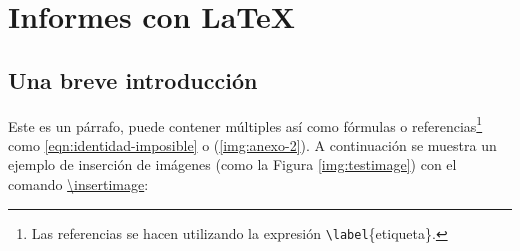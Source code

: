%
%

\section{Informes con \LaTeX}

\subsection{Una breve introducción}
	
	Este es un párrafo, puede contener múltiples  así como fórmulas o referencias\footnote{Las referencias se hacen utilizando la expresión \texttt{\textbackslash label}\{etiqueta\}.} como \eqref{eqn:identidad-imposible} o (\ref{img:anexo-2}). A continuación se muestra un ejemplo de inserción de imágenes (como la Figura \ref{img:testimage}) con el comando \href{https://template-latex.github.io/informe.html#hlp-imagen}{\textbackslash insertimage}:


